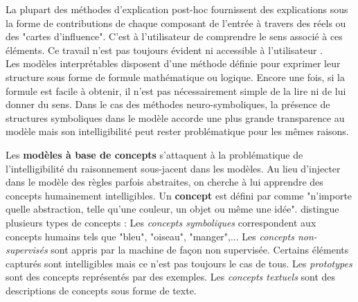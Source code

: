 \documentclass{report}
\begin{document}
    La plupart des méthodes d'explication post-hoc fournissent des explications sous la forme de contributions de chaque composant de l'entrée à travers des réels ou des "cartes d'influence". C'est à l'utilisateur de comprendre le sens associé à ces éléments. Ce travail n'est pas toujours évident ni accessible à l'utilisateur \cite{poursabzi-sangdeh_manipulating_2021}.\\
    Les modèles interprétables disposent d'une méthode définie pour exprimer leur structure sous forme de formule mathématique ou logique. Encore une fois, si la formule est facile à obtenir, il n'est pas nécessairement simple de la lire ni de lui donner du sens. Dans le cas des méthodes neuro-symboliques, la présence de structures symboliques dans le modèle accorde une plus grande transparence au modèle mais son intelligibilité peut rester problématique pour les mêmes raisons.
    
    Les \textbf{modèles à base de concepts} s'attaquent à la problématique de l'intelligibilité du raisonnement sous-jacent dans les modèles. Au lieu d'injecter dans le modèle des règles parfois abstraites, on cherche à lui apprendre des concepts humainement intelligibles. Un \textbf{concept} est défini par \cite[Chap.~29]{molnar_interpretable_2025} comme "n'importe quelle abstraction, telle qu'une couleur, un objet ou même une idée".  \cite{poeta_concept-based_2023} distingue plusieurs types de concepts : Les \emph{concepts symboliques}  correspondent aux concepts humains tels que "bleu", "oiseau", "manger",...  Les \emph{concepts non-supervisés} sont appris par la machine de façon non supervisée. Certains éléments capturés sont intelligibles mais ce n'est pas toujours le cas de tous. Les \emph{prototypes} sont des concepts représentés par des exemples. Les \emph{concepts textuels} sont des descriptions de concepts sous forme de texte.
    
\end{document}
